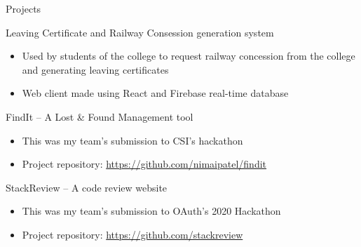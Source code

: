\documentclass{article}
\newlength{\tabin}
\newlength{\secsep}
\newcommand{\lineunder}{\vspace*{-8pt} \\ \hspace*{-6pt} \hrulefill \\ \vspace*{-15pt}}
\newenvironment{tabbedsection}[1]{
	\begin{list}{}{
		\setlength{\itemsep}{0pt}
		\setlength{\labelsep}{0pt}
		\setlength{\labelwidth}{0pt}
		\setlength{\leftmargin}{\tabin}
		\setlength{\rightmargin}{\tabin}
		\setlength{\listparindent}{0pt}
		\setlength{\parsep}{0pt}
		\setlength{\parskip}{0pt}
		\setlength{\partopsep}{0pt}
		\setlength{\topsep}{#1}
	}
	\item[]
}{\end{list}}
\newenvironment{resume_section}[1]{
	\filbreak
	\vspace{2\secsep}
	\textsc{\large#1}
	\lineunder
	\begin{tabbedsection}{\secsep}
}{\end{tabbedsection}}
\newenvironment{resume_subsection}[2][]{
	\textbf{#2} \hfill {\footnotesize #1} \hspace{2em}
	\begin{tabbedsection}{0.5\secsep}
}{\end{tabbedsection}}
\newenvironment{subitems}{
	\renewcommand{\labelitemi}{-}
	\begin{itemize}
		\setlength{\labelsep}{1em}
}{\end{itemize}}
\begin{document}
\begin{resume_section}{Projects}
	\begin{resume_subsection}{Leaving Certificate and Railway Consession generation system}
		\begin{subitems}
			\item Used by students of the college to request
				railway concession from the college and
				generating leaving certificates
			\item Web client made using React and Firebase real-time database
		\end{subitems}
	\end{resume_subsection}

	\begin{resume_subsection}{FindIt -- A Lost {\&} Found Management tool}
		\begin{subitems}
			\item This was my team's submission to CSI's hackathon
			\item Project repository: \href{https://github.com/nimaipatel/findit}{https://github.com/nimaipatel/findit}
		\end{subitems}
	\end{resume_subsection}

	\begin{resume_subsection}{StackReview -- A code review website}
		\begin{subitems}
			\item This was my team's submission to OAuth's 2020 Hackathon
			\item Project repository: \href{https://github.com/stackreview}{https://github.com/stackreview}
		\end{subitems}
	\end{resume_subsection}

\end{resume_section}
\end{document}
